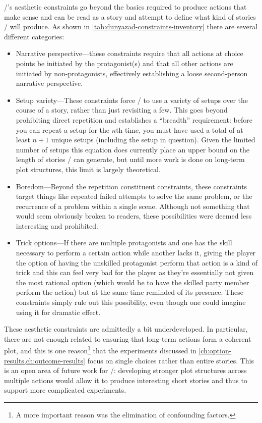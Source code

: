 \dunyazad/'s aesthetic constraints go beyond the basics required to produce actions that make sense and can be read as a story and attempt to define what kind of stories \dunyazad/ will produce.
%
As shown in \cref{tab:dunyazad-constraints-inventory} there are several different categories:
%
\begin{itemize}
  \item Narrative perspective---these constraints require that all actions at choice points be initiated by the protagonist(s) and that all other actions are initiated by non-protagonists, effectively establishing a loose second-person narrative perspective.
  \item Setup variety---These constraints force \dunyazad/ to use a variety of setups over the course of a story, rather than just revisiting a few. This goes beyond prohibiting direct repetition and establishes a ``breadth'' requirement: before you can repeat a setup for the $n$th time, you must have used a total of at least $n+1$ unique setups (including the setup in question). Given the limited number of setups this equation does currently place an upper bound on the length of stories \dunyazad/ can generate, but until more work is done on long-term plot structures, this limit is largely theoretical.
  \item Boredom---Beyond the repetition constituent constraints, these constraints target things like repeated failed attempts to solve the same problem, or the recurrence of a problem within a single scene. Although not something that would seem obviously broken to readers, these possibilities were deemed less interesting and prohibited.
  \item Trick options---If there are multiple protagonists and one has the skill necessary to perform a certain action while another lacks it, giving the player the option of having the unskilled protagonist perform that action is a kind of trick and this can feel very bad for the player as they're essentially not given the most rational option (which would be to have the skilled party member perform the action) but at the same time reminded of its presence. These constraints simply rule out this possibility, even though one could imagine using it for dramatic effect.
\end{itemize}


These aesthetic constraints are admittedly a bit underdeveloped.
%
In particular, there are not enough related to ensuring that long-term actions form a coherent plot, and this is one reason\footnote{A more important reason was the elimination of confounding factors.} that the experiments discussed in \cref{ch:option-results,ch:outcome-results} focus on single choices rather than entire stories.
%
This is an open area of future work for \dunyazad/: developing stronger plot structures across multiple actions would allow it to produce interesting short stories and thus to support more complicated experiments.

